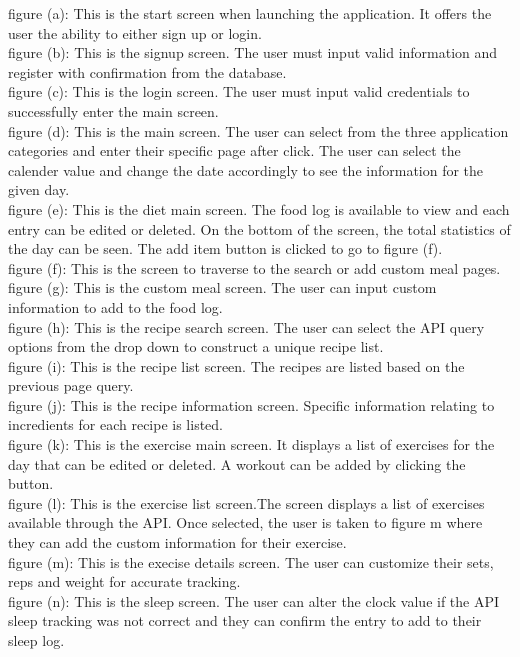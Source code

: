 \documentclass[12pt, titlepage]{article}
\begin{document}
figure (a): This is the start screen when launching the application. It offers the user the ability to either sign up or login.
\\figure (b): This is the signup screen. The user must input valid information and register with confirmation from the database.
\\figure (c): This is the login screen. The user must input valid credentials to successfully enter the main screen.
\\figure (d): This is the main screen. The user can select from the three application categories and enter their specific page after click. The user can select the calender value and change the date accordingly to see the information for the given day.
\\figure (e): This is the diet main screen. The food log is available to view and each entry can be edited or deleted. On the bottom of the screen, the total statistics of the day can be seen. The add item button is clicked to go to figure (f).
\\figure (f): This is the screen to traverse to the search or add custom meal pages.
\\figure (g): This is the custom meal screen. The user can input custom information to add to the food log.
\\figure (h): This is the recipe search screen. The user can select the API query options from the drop down to construct a unique recipe list.
\\figure (i): This is the recipe list screen. The recipes are listed based on the previous page query. 
\\figure (j): This is the recipe information screen. Specific information relating to incredients for each recipe is listed.
\\figure (k): This is the exercise main screen. It displays a list of exercises for the day that can be edited or deleted. A workout can be added by clicking the button.
\\figure (l): This is the exercise list screen.The screen displays a list of exercises available through the API. Once selected, the user is taken to figure m where they can add the custom information for their exercise. 
\\figure (m): This is the execise details screen. The user can customize their sets, reps and weight for accurate tracking.
\\figure (n): This is the sleep screen. The user can alter the clock value if the API sleep tracking was not correct and they can confirm the entry to add to their sleep log. 
\end{document}
